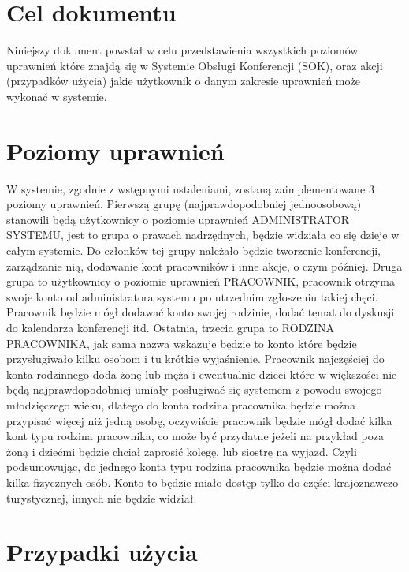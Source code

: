﻿\section{Cel dokumentu}
\suppressfloats[t]

Niniejszy dokument powstał w celu przedstawienia wszystkich poziomów uprawnień które znajdą się w Systemie Obsługi Konferencji (SOK), oraz akcji (przypadków użycia) jakie użytkownik o danym zakresie uprawnień może wykonać w systemie. 

\section{Poziomy uprawnień}

W systemie, zgodnie z wstępnymi ustaleniami, zostaną zaimplementowane 3 poziomy uprawnień. \newline
Pierwszą grupę (najprawdopodobniej jednoosobową) stanowili będą użytkownicy o poziomie uprawnień ADMINISTRATOR SYSTEMU, jest to grupa o prawach nadrzędnych, będzie widziała co się dzieje w całym systemie. Do członków tej grupy należało będzie tworzenie konferencji, zarządzanie nią, dodawanie kont pracowników i inne akcje, o czym później. \newline
Druga grupa to użytkownicy o poziomie uprawnień PRACOWNIK, pracownik otrzyma swoje konto od administratora systemu po utrzednim zgłoszeniu takiej chęci. Pracownik będzie mógł dodawać konto swojej rodzinie, dodać temat do dyskusji do kalendarza konferencji itd. \newline
Ostatnia, trzecia grupa to RODZINA PRACOWNIKA, jak sama nazwa wskazuje będzie to konto które będzie przysługiwało kilku osobom i tu krótkie wyjaśnienie. Pracownik najczęściej do konta rodzinnego doda żonę lub męża i ewentualnie dzieci które w większości nie będą najprawdopodobniej umiały posługiwać się systemem z powodu swojego młodzięczego wieku, dlatego do konta rodzina pracownika będzie można przypisać więcej niż jedną osobę, oczywiście pracownik będzie mógł dodać kilka kont typu rodzina pracownika, co może być przydatne jeżeli na przykład poza żoną i dziećmi będzie chciał zaprosić kolegę, lub siostrę na wyjazd. Czyli podsumowując, do jednego konta typu rodzina pracownika będzie można dodać kilka fizycznych osób. Konto to będzie miało dostęp tylko do części krajoznawczo turystycznej, innych nie będzie widział.

\section{Przypadki użycia}

